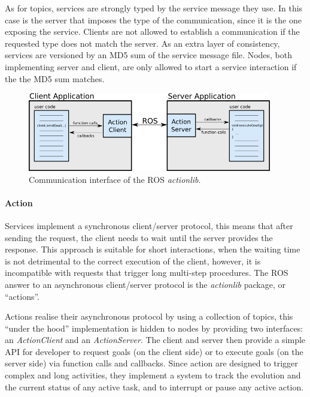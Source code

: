 As for topics, services are strongly typed by the service message they use. In this case is the server that imposes the type of the communication, since it is the one exposing the service. Clients are not allowed to establish a communication if the requested type does not match the server. As an extra layer of consistency, services are versioned by an MD5 sum of the service message file. Nodes, both implementing server and client, are only allowed to start a service interaction if the the MD5 sum matches.

\begin{figure}[t]
    \centering
    \includegraphics[width=0.95\textwidth]{gfx/ros/action}
    \caption{Communication interface of the ROS \textit{actionlib}.}\label{fig:ros-action}
\end{figure}

\paragraph{Action} Services implement a synchronous client/server protocol, this means that after sending the request, the client needs to wait until the server provides the response. This approach is suitable for short interactions, when the waiting time is not detrimental to the correct execution of the client, however, it is incompatible with requests that trigger long multi-step procedures. The ROS answer to an asynchronous client/server protocol is the \textit{actionlib} package, or ``actions''.

Actions realise their asynchronous protocol by using a collection of topics, this ``under the hood'' implementation is hidden to nodes by providing two interfaces: an \textit{ActionClient} and an \textit{ActionServer}. The client and server then provide a simple API for developer to request goals (on the client side) or to execute goals (on the server side) via function calls and callbacks. Since action are designed to trigger complex and long activities, they implement a system to track the evolution and the current status of any active task, and to interrupt or pause any active action.

